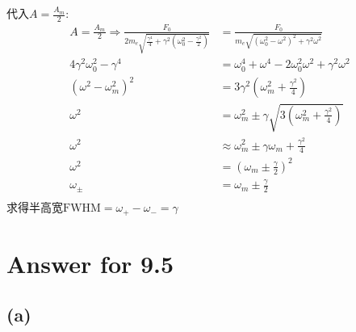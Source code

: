 \documentclass[twoside]{article}
\begin{document}
代入$A = \frac{A_m}{2}$:
\begin{equation}
    \begin{split}
        A = \frac{A_m}{2} \Rightarrow \frac{F_0}{2m_e \sqrt{\frac{\gamma^4}{4} + \gamma^2 \left(\omega_0^2 - \frac{\gamma^2}{2}\right)}} & = \frac{F_0}{m_e \sqrt{(\omega_0^2 - \omega^2)^2 + \gamma^2 \omega^2}}       \\
        4\gamma^2 \omega_0^2 - \gamma^4                                                                                                  & = \omega_0^4 + \omega^4 - 2\omega_0^2\omega^2 + \gamma^2 \omega^2            \\
        \left(\omega^2 - \omega_m^2\right)^2                                                                                             & = 3 \gamma^2 \left(\omega_m^2 + \frac{\gamma^2}{4}\right)                    \\
        \omega^2                                                                                                                         & = \omega_m^2 \pm \gamma \sqrt{3\left(\omega_m^2 + \frac{\gamma^2}{4}\right)} \\
        \omega^2                                                                                                                         & \approx \omega_m^2 \pm \gamma \omega_m + \frac{\gamma^2}{4}                  \\
        \omega^2                                                                                                                         & = \left(\omega_m \pm \frac{\gamma}{2}\right)^2                               \\
        \omega_\pm                                                                                                                       & = \omega_m \pm \frac{\gamma}{2}                                              \\
    \end{split}
\end{equation}
求得半高宽$\text{FWHM} = \omega_+ - \omega_- = \gamma$

\section*{Answer for 9.5}

\subsection*{(a)}
\end{document}
